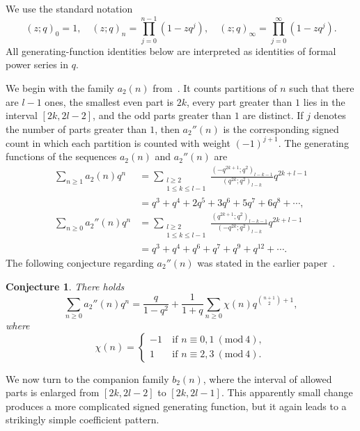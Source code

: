 \documentclass[10pt,a4paper]{amsart}
\newtheorem{conjecture} {Conjecture}
\numberwithin{equation}{section}
\newcommand{\Mod}[1]{\ (\mathrm{mod}\ #1)}
\newcommand{\fr}{\frac}
\begin{document}
We use the standard notation~\cite{Andrews, Gasper-Rahman}
\[
(z;q)_0 = 1,\quad  (z;q)_n = \prod_{j=0}^{n-1} (1-zq^j),\quad
(z;q)_{\infty} = \prod_{j=0}^{\infty} (1-zq^j).
\]
All generating-function identities below are interpreted as identities of formal power series in $q$.

We begin with the family $a_2(n)$ from~\cite[Definition 2]{Andrews-Bachraoui conjectures}. It counts partitions of $n$ such that there are $l-1$ ones, the smallest even part is $2k$, every part greater than $1$ lies in the interval $[2k,2l-2]$, and the odd parts greater than $1$ are distinct. If $j$ denotes the number of parts greater than $1$, then $a_2''(n)$ is the corresponding signed count in which each partition is counted with weight $(-1)^{j+1}$. The generating functions of the sequences $a_2(n)$ and $a_2''(n)$ are
\begin{align*}
\sum_{n\geq 1} a_2(n) q^n &= \sum_{\substack{l\geq 2\\1\leq k\leq l-1}}\fr{(-q^{2k+1};q^2)_{l-k-1}}{(q^{2k};q^2)_{l-k}}q^{2k+l-1} \\
&=q^3+q^4+2q^5+3q^6+5q^7+6q^8+\cdots, \\
\sum_{n\geq 0} a_2''(n) q^n &= \sum_{\substack{l\geq 2\\1\leq k\leq l-1}}\fr{(q^{2k+1};q^2)_{l-k-1}}{(-q^{2k};q^2)_{l-k}}q^{2k+l-1} \\
&=q^3+q^4+q^6+q^7+q^9+q^{12}+\cdots.
\end{align*}
The following conjecture regarding $a_2''(n)$ was stated in the earlier paper~\cite[Conjecture 1]{Andrews-Bachraoui conjectures}.
\begin{conjecture}\label{conj1}
There holds
\begin{equation}\label{conj1-id}
\sum_{n\geq 0} a_2''(n) q^n
=\fr{q}{1-q^2}+\fr{1}{1+q}\sum_{n\geq 0} \chi(n) q^{\binom{n+1}{2}+1},
\end{equation}
where
\[
\chi(n)
=\begin{cases}
-1 &\ \text{if\ }n\equiv 0,1\Mod{4}, \\
1 &\ \text{if\ }n\equiv 2,3\Mod{4}.
\end{cases}
\]
\end{conjecture}

We now turn to the companion family $b_2(n)$, where the interval of allowed parts is enlarged from $[2k,2l-2]$ to $[2k,2l-1]$. This apparently small change produces a more complicated signed generating function, but it again leads to a strikingly simple coefficient pattern.
\end{document}
